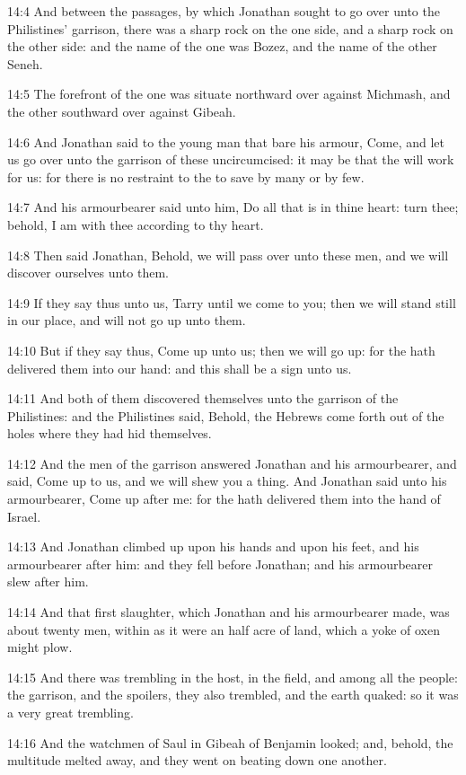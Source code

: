 14:4 And between the passages, by which Jonathan sought to go over unto the Philistines' garrison, there was a sharp rock on the one side, and a sharp rock on the other side: and the name of the one was Bozez, and the name of the other Seneh.

14:5 The forefront of the one was situate northward over against Michmash, and the other southward over against Gibeah.

14:6 And Jonathan said to the young man that bare his armour, Come, and let us go over unto the garrison of these uncircumcised: it may be that the \LORD will work for us: for there is no restraint to the \LORD to save by many or by few.

14:7 And his armourbearer said unto him, Do all that is in thine heart: turn thee; behold, I am with thee according to thy heart.

14:8 Then said Jonathan, Behold, we will pass over unto these men, and we will discover ourselves unto them.

14:9 If they say thus unto us, Tarry until we come to you; then we will stand still in our place, and will not go up unto them.

14:10 But if they say thus, Come up unto us; then we will go up: for the \LORD hath delivered them into our hand: and this shall be a sign unto us.

14:11 And both of them discovered themselves unto the garrison of the Philistines: and the Philistines said, Behold, the Hebrews come forth out of the holes where they had hid themselves.

14:12 And the men of the garrison answered Jonathan and his armourbearer, and said, Come up to us, and we will shew you a thing.  And Jonathan said unto his armourbearer, Come up after me: for the \LORD hath delivered them into the hand of Israel.

14:13 And Jonathan climbed up upon his hands and upon his feet, and his armourbearer after him: and they fell before Jonathan; and his armourbearer slew after him.

14:14 And that first slaughter, which Jonathan and his armourbearer made, was about twenty men, within as it were an half acre of land, which a yoke of oxen might plow.

14:15 And there was trembling in the host, in the field, and among all the people: the garrison, and the spoilers, they also trembled, and the earth quaked: so it was a very great trembling.

14:16 And the watchmen of Saul in Gibeah of Benjamin looked; and, behold, the multitude melted away, and they went on beating down one another.

